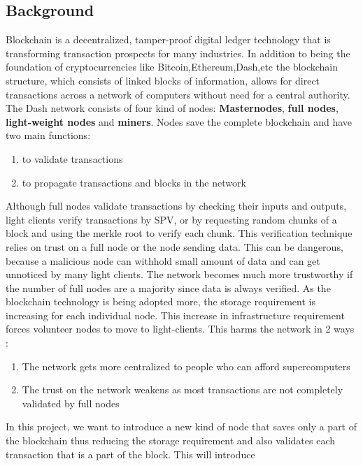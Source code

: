 \documentclass[conference]{IEEEtran}
\begin{document}
\subsection{Background}
    Blockchain is a decentralized, tamper-proof digital ledger technology that
    is transforming transaction prospects for many industries. In addition to
    being the foundation of cryptocurrencies like Bitcoin,Ethereum,Dash,etc the blockchain
    structure, which consists of linked blocks of information, allows for direct
    transactions across a network of computers without need for a central
    authority. The Dash network consists of four kind of nodes:
    \textbf{Masternodes}, \textbf{full nodes}, \textbf{light-weight nodes } and \textbf{miners}. Nodes
    save the complete blockchain and have two main functions: 
    \begin{enumerate}[label=(\alph*)]
        \item to validate transactions
        \item to propagate transactions and blocks in the network
    \end{enumerate} 
    Although full nodes validate transactions by checking their inputs and
    outputs, light clients verify transactions by SPV, or by requesting random
    chunks of a block and using the merkle root to verify each chunk. This
    verification technique relies on trust on a full node or the node sending
    data. This can be dangerous, because a malicious node can withhold small
    amount of data and can get unnoticed by many light clients. The network
    becomes much more trustworthy if the number of full nodes are a majority
    since data is always verified. As the blockchain technology is being adopted
    more, the storage requirement is increasing for each individual node. This
    increase in infrastructure requirement forces volunteer nodes to move to
    light-clients. This harms the network in 2 ways :
    \begin{enumerate}[label=(\alph*)]
        \item The network gets more centralized to people who can afford
            supercomputers
        \item The trust on the network weakens as most transactions are not
            completely validated by full nodes
    \end{enumerate}
    In this project, we want to introduce a new kind of node that saves only a
    part of the blockchain thus reducing the storage requirement and also
    validates each transaction that is a part of the block. This will introduce
\end{document}
